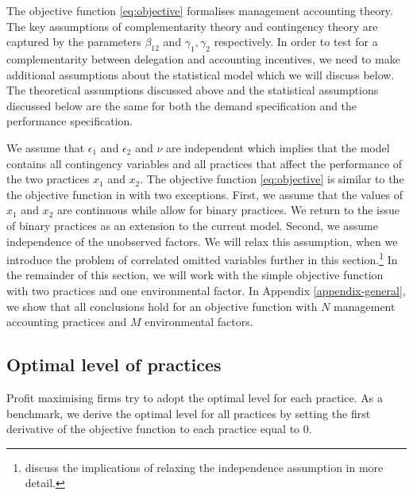 \documentclass[12pt]{article}
\begin{document}
The objective function \eqref{eq:objective} formalises management accounting theory. The key assumptions of complementarity theory and contingency theory are captured by the parameters $\beta_{12}$ and $\gamma_1, \gamma_2$ respectively. In order to test for a complementarity between delegation and accounting incentives, we need to make additional assumptions about the statistical model which we will discuss below. The theoretical assumptions discussed above and the statistical assumptions discussed below are the same for both the demand specification and the performance specification.

We assume that $\epsilon_1$ and $\epsilon_2$ and $\nu$ are independent which implies that the model contains all contingency variables and all practices that affect the performance of the two practices $x_1$ and $x_2$. The objective function \eqref{eq:objective} is similar to the the objective function in \citet{kretschmer_competitive_2012} with two exceptions. First, we assume that the values of $x_1$ and $x_2$ are continuous while \citet{kretschmer_competitive_2012} allow for binary practices. We return to the issue of binary practices as an extension to the current model. Second, we assume independence of the unobserved factors. We will relax this assumption, when we introduce the problem of correlated omitted variables further in this section.\footnote{\citet{athey_empirical_1998} discuss the implications of relaxing the independence assumption in more detail.}  In the remainder of this section, we will work with the simple objective function with two practices and one environmental factor. In Appendix \ref{appendix-general}, we show that all conclusions hold for an objective function with $N$ management accounting practices and $M$ environmental factors.

\subsection{Optimal level of practices}

Profit maximising firms try to adopt the optimal level for each practice. As a benchmark, we derive the optimal level for all practices by setting the first derivative of the objective function to each practice equal to $0$.
\end{document}
